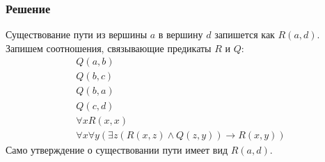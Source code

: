\documentclass[11pt]{article}
\newcounter{th}\setcounter{th}{0}
\begin{document}
\subsubsection{Решение}
\label{sec:org0299a17}
Существование пути из вершины \(a\) в вершину \(d\) запишется как \(R(a, d)\). Запишем соотношения, связывающие предикаты \(R\) и \(Q\):
\begin{gather*}
Q(a, b) \\
Q(b, c) \\
Q(b, a) \\
Q(c, d) \\
\forall x R(x, x) \\
\forall x \forall y (\exists z (R(x, z) \land Q(z, y)) \to R(x, y))
\end{gather*}
Само утверждение о существовании пути имеет вид $R(a, d)$.
\end{document}
